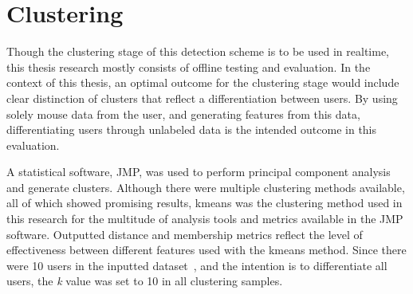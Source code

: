 
\section{Clustering}\label{sec:evaluation-clustering}
Though the clustering stage of this detection scheme is to be used in realtime, this thesis research mostly consists of offline testing and evaluation. In the context of this thesis, an optimal outcome for the clustering stage would include clear distinction of clusters that reflect a differentiation between users. By using solely mouse data from the user, and generating features from this data, differentiating users through unlabeled data is the intended outcome in this evaluation.

A statistical software, JMP, was used to perform principal component analysis and generate clusters. Although there were multiple clustering methods available, all of which showed promising results, kmeans was the clustering method used in this research for the multitude of analysis tools and metrics available in the JMP software. Outputted distance and membership metrics reflect the level of effectiveness between different features used with the kmeans method. Since there were 10 users in the inputted dataset~\cite{balabit_dataset}, and the intention is to differentiate all users, the \textit{k} value was set to 10 in all clustering samples.

